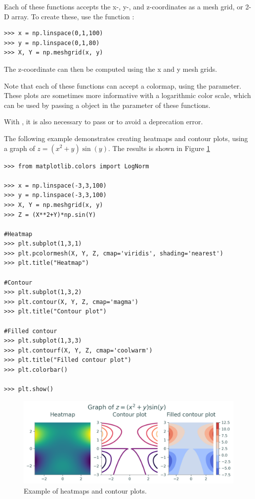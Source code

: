 Each of these functions accepts the x-, y-, and z-coordinates as a mesh grid, or 2-D array.
To create these, use the function :
\begin{lstlisting}
>>> x = np.linspace(0,1,100)
>>> y = np.linspace(0,1,80)
>>> X, Y = np.meshgrid(x, y)
\end{lstlisting} 
The z-coordinate can then be computed using the x and y mesh grids.

Note that each of these functions can accept a colormap, using the  parameter.
These plots are sometimes more informative with a logarithmic color scale, which can be used by passing a  object in the  parameter of these functions.

With , it is also necessary to pass  or  to avoid a deprecation error.

The following example demonstrates creating heatmaps and contour plots, using a graph of $z=(x^2+y)\sin(y)$.
The results is shown in Figure \ref{mpl:contour}
\begin{lstlisting}
>>> from matplotlib.colors import LogNorm

>>> x = np.linspace(-3,3,100)
>>> y = np.linspace(-3,3,100)
>>> X, Y = np.meshgrid(x, y)
>>> Z = (X**2+Y)*np.sin(Y)

#Heatmap
>>> plt.subplot(1,3,1)
>>> plt.pcolormesh(X, Y, Z, cmap='viridis', shading='nearest')
>>> plt.title("Heatmap")

#Contour
>>> plt.subplot(1,3,2)
>>> plt.contour(X, Y, Z, cmap='magma')
>>> plt.title("Contour plot")

#Filled contour
>>> plt.subplot(1,3,3)
>>> plt.contourf(X, Y, Z, cmap='coolwarm')
>>> plt.title("Filled contour plot")
>>> plt.colorbar()

>>> plt.show()

\end{lstlisting}
\begin{figure}[H]
\centering
\includegraphics[width=\textwidth]{figures/heat_contour_example.png}
\caption{Example of heatmaps and contour plots.}
\label{mpl:contour}
\end{figure}

